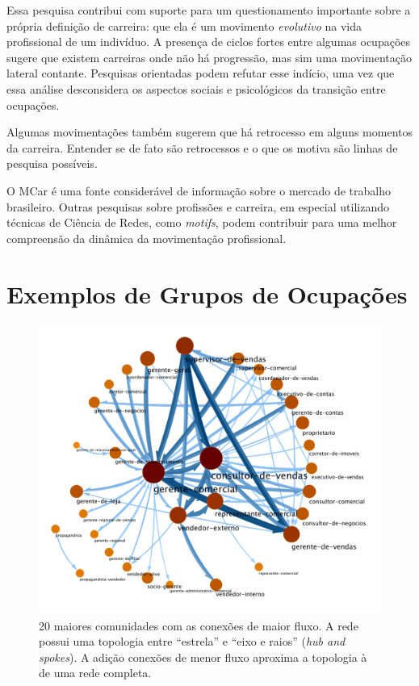 \documentclass[
  article,
  11pt,
  a4paper,
  english,
  brazil,
  sumario=tradicional]{abntex2}
\begin{document}
Essa pesquisa contribui com suporte para um questionamento importante sobre a própria definição de carreira: que ela é um movimento \textit{evolutivo} na vida profissional de um indivíduo. A presença de ciclos fortes entre algumas ocupações sugere que existem carreiras onde não há progressão, mas sim uma movimentação lateral contante. Pesquisas orientadas podem refutar esse indício, uma vez que essa análise desconsidera os aspectos sociais e psicológicos da transição entre ocupações.

Algumas movimentações também sugerem que há retrocesso em alguns momentos da carreira. Entender se de fato são retrocessos e o que os motiva são linhas de pesquisa possíveis.

O MCar é uma fonte considerável de informação sobre o mercado de trabalho brasileiro. Outras pesquisas sobre profissões e carreira, em especial utilizando técnicas de Ciência de Redes, como \textit{motifs}, podem contribuir para uma melhor compreensão da dinâmica da movimentação profissional.

\newpage

\appendix

\section{Exemplos de Grupos de Ocupações}

\begin{figure}[h]
  \centering
  \includegraphics[width=0.7\linewidth]{ex-sobreposicao-consultor-de-vendas.pdf}
  \caption{20 maiores comunidades com as conexões de maior fluxo. A rede possui uma topologia entre \enquote{estrela} e \enquote{eixo e raios} (\textit{hub and spokes}). A adição conexões de menor fluxo aproxima a topologia à de uma rede completa.}
  \label{fig:ex-sobreposicao-vendas}
\end{figure}
\end{document}
